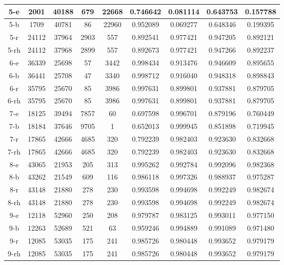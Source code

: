 \begin{longtable}[!h]{|c|c|c|c|c|c|c|c|c|}
	\hline \rowcolor{bad}	5-e	&	2001	&	40188	&	679	&	22668	&	0.746642	&	0.081114	&	0.643753	&	0.157788	\\
	\hline	5-b	&	1709	&	40781	&	86	&	22960	&	0.952089	&	0.069277	&	0.648346	&	0.199395	\\
	\hline	5-r	&	24112	&	37964	&	2903	&	557	&	0.892541	&	0.977421	&	0.947205	&	0.892121	\\
	\hline \rowcolor{closest}	5-rh	&	24112	&	37968	&	2899	&	557	&	0.892673	&	0.977421	&	0.947266	&	0.892237	\\
	
	\hline	6-e	&	36339	&	25698	&	57	&	3442	&	0.998434	&	0.913476	&	0.946609	&	0.895655	\\
	\hline \rowcolor{closest}	6-b	&	36441	&	25708	&	47	&	3340	&	0.998712	&	0.916040	&	0.948318	&	0.898843	\\
	\hline \rowcolor{bad}	6-r	&	35795	&	25670	&	85	&	3986	&	0.997631	&	0.899801	&	0.937881	&	0.879705	\\
	\hline \rowcolor{bad}	6-rh	&	35795	&	25670	&	85	&	3986	&	0.997631	&	0.899801	&	0.937881	&	0.879705	\\
	
	\hline	7-e	&	18125	&	39494	&	7857	&	60	&	0.697598	&	0.996701	&	0.879196	&	0.760449	\\
	\hline \rowcolor{bad}	7-b	&	18184	&	37646	&	9705	&	1	&	0.652013	&	0.999945	&	0.851898	&	0.719945	\\
	\hline \rowcolor{closest}	7-r	&	17865	&	42666	&	4685	&	320	&	0.792239	&	0.982403	&	0.923630	&	0.832668	\\
	\hline \rowcolor{closest}	7-rh	&	17865	&	42666	&	4685	&	320	&	0.792239	&	0.982403	&	0.923630	&	0.832668	\\
	
	\hline	8-e	&	43065	&	21953	&	205	&	313	&	0.995262	&	0.992784	&	0.992096	&	0.982368	\\
	\hline \rowcolor{bad}	8-b	&	43262	&	21549	&	609	&	116	&	0.986118	&	0.997326	&	0.988937	&	0.975287	\\
	\hline \rowcolor{closest}	8-r	&	43148	&	21880	&	278	&	230	&	0.993598	&	0.994698	&	0.992249	&	0.982674	\\
	\hline \rowcolor{closest}	8-rh	&	43148	&	21880	&	278	&	230	&	0.993598	&	0.994698	&	0.992249	&	0.982674	\\
	
	\hline	9-e	&	12118	&	52960	&	250	&	208	&	0.979787	&	0.983125	&	0.993011	&	0.977150	\\
	\hline \rowcolor{bad}	9-b	&	12263	&	52689	&	521	&	63	&	0.959246	&	0.994889	&	0.991089	&	0.971480	\\
	\hline \rowcolor{closest}	9-r	&	12085	&	53035	&	175	&	241	&	0.985726	&	0.980448	&	0.993652	&	0.979179	\\
	\hline \rowcolor{closest}	9-rh	&	12085	&	53035	&	175	&	241	&	0.985726	&	0.980448	&	0.993652	&	0.979179	\\
	

\end{longtable}
